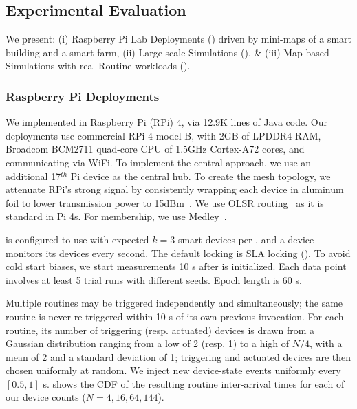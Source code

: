 \subsection{Experimental Evaluation}
\label{comesh:sec:expts}
We present: 
(i) Raspberry Pi Lab Deployments   () driven by mini-maps of a smart building and a smart farm, 
(ii) Large-scale Simulations  (), \&  
(iii) Map-based Simulations with real Routine workloads (). 


\subsubsection{Raspberry Pi Deployments}
\label{comesh:sec:pidep}

We implemented \sysname{} in  Raspberry Pi (RPi) 4, via  {12.9K lines of Java code}. Our deployments use commercial RPi 4 model B,
with 2GB of LPDDR4 RAM, Broadcom BCM2711 quad-core CPU of 1.5GHz Cortex-A72 cores, and communicating via WiFi.
To implement the central approach, we use an additional 17$^{th}$ Pi device as the central hub. 
To create the mesh topology, we attenuate RPi's strong signal by consistently wrapping each device in aluminum foil to lower transmission power to 15dBm~\cite{Safehome}.
We use OLSR routing~\cite{olsrd} as it is standard in Pi 4s.
For membership, we use Medley~\cite{medley}.

\sysname{} is configured to use \kgroups{} with expected $k=3$ smart devices per \kgroup, and a device \kgroup{} monitors its devices every second. The default locking is  SLA locking ().
To avoid cold start biases, we start measurements 10 s after \sysname{} is initialized. Each data point involves at least 5 trial runs with different seeds.
Epoch length is 60 s.

 Multiple routines may be triggered independently and simultaneously; the same routine is never re-triggered within 10 s of its own previous invocation. For each routine, its number of triggering (resp. actuated) devices is drawn from a Gaussian distribution ranging from a low of 2 (resp. 1) to a high of $N/4$, with a mean of 2 and a standard deviation of 1; triggering and actuated devices are then chosen uniformly at random. We inject new device-state events uniformly every $[0.5, 1]$ s.  shows the CDF of the resulting routine inter-arrival times for each of our device counts ($N = 4, 16, 64, 144$).


